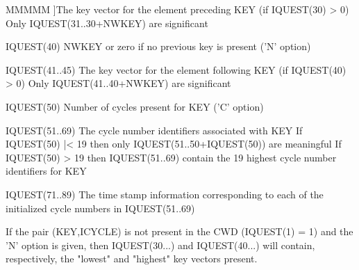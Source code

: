 \begin{DL}{MMMMM}
]The key vector for the element preceding KEY (if IQUEST(30) > 0)
\newline Only IQUEST(31..30+NWKEY) are significant
\par
\item[IQUEST(40)
]NWKEY or zero if no previous key is present ('N' option)
\item[IQUEST(41..45)
]The key vector for the element following KEY (if IQUEST(40) > 0)
\newline Only IQUEST(41..40+NWKEY) are significant
\par
\item[IQUEST(50)
]Number of cycles present for KEY
('C' option)
\item[IQUEST(51..69)
]The cycle number identifiers associated with KEY
\newline If IQUEST(50) |< 19 then only IQUEST(51..50+IQUEST(50))
are meaningful
\newline If IQUEST(50) > 19 then IQUEST(51..69) contain the 19 highest
cycle number identifiers for KEY
\item[IQUEST(71..89)
]The time stamp information corresponding to each of the
initialized cycle numbers in IQUEST(51..69)
\end{DL}
\par If the pair (KEY,ICYCLE) is not present in the CWD (IQUEST(1) = 1) and
the 'N' option is given, then IQUEST(30...) and IQUEST(40...) will
contain, respectively, the "lowest" and "highest" key vectors present.
